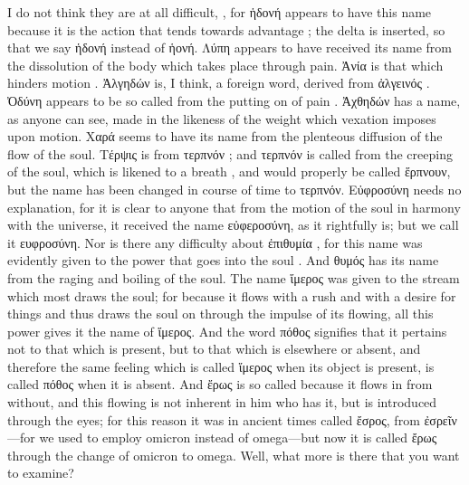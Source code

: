 {{{{{I do not think they are at all difficult, \hermogenesspeaks, for ἡδονή appears to have this name because it is the action that tends towards advantage ; the delta is inserted, so that we say ἡδονή instead of ἡονή.  Λύπη appears to have received its name from the dissolution  of the body which takes place through pain. Ἀνία  is that which hinders motion . Ἀλγηδών  is, I think, a foreign word, derived from ἀλγεινός . Ὀδύνη  appears to be so called from the putting on of pain . Ἀχθηδών  has a name, as anyone can see, made in the likeness of the weight  which vexation imposes upon motion. Χαρά  seems to have its name from the plenteous diffusion  of the flow of the soul.  Τέρψις  is from τερπνόν ; and τερπνόν is called from the creeping  of the soul, which is likened to a breath , and would properly be called ἕρπνουν, but the name has been changed in course of time to τερπνόν. Εὐφροσύνη needs no explanation, for it is clear to anyone that from the motion of the soul in harmony  with the universe, it received the name εὐφεροσύνη, as it rightfully is; but we call it ευφροσύνη.  Nor is there any difficulty about ἐπιθυμία , for this name was evidently given to the power that goes  into the soul . And θυμός has its name from the raging  and boiling of the soul. The name ἵμερος  was given to the stream  which most draws the soul;  for because it flows with a rush  and with a desire for things and thus draws the soul on through the impulse of its flowing, all this power gives it the name of ἵμερος. And the word πόθος signifies that it pertains not to that which is present, but to that which is elsewhere  or absent, and therefore the same feeling which is called ἵμερος when its object is present, is called πόθος when it is absent. And ἔρως  is so called because it flows in  from without, and this flowing is not inherent in him who has it,  but is introduced through the eyes; for this reason it was in ancient times called ἔσρος, from ἐσρεῖν—for we used to employ omicron instead of omega—but now it is called ἔρως through the change of omicron to omega. Well, what more is there that you want to examine?
}}}}}
